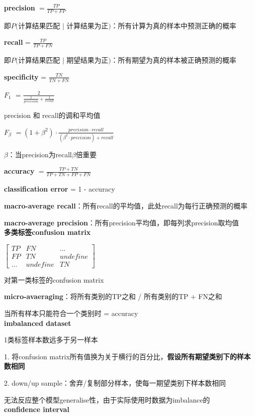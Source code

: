 \documentclass[UTF8]{ctexart}
\begin{document}
  \quad \textbf{precision} $= \frac{TP}{TP + FP}$

  \quad \quad 即$P($计算结果匹配 $|$ 计算结果为正$)$：所有计算为真的样本中预测正确的概率

  \quad \textbf{recall} = $\frac{TP}{TP + FN}$

  \quad \quad 即$P($计算结果匹配 $|$ 期望结果为正$)$：所有期望为真的样本被正确预测的概率

  \quad \textbf{specificity} = $\frac{TN}{TN + FN}$

  \quad \textbf{$F_1$} $= \frac{2}{\frac{1}{precision} + \frac{1}{recall}}$ 
  
  \quad \quad precision 和 recall的调和平均值

  \quad \textbf{$F_\beta$} $= (1 + \beta^2) \cdot \frac{precision \cdot recall}{(\beta^2 \cdot precision) + recall}$

  \quad \quad $\beta$：当precision为recall$\beta$倍重要

  \textbf{accuracy} $= \frac{TP + TN}{TP + TN + FP + FN}$

  \textbf{classification error} = 1 - accuracy
  
  \textbf{macro-average recall}：所有recall的平均值，此处recall为每行正确预测的概率

  \textbf{macro-average precision}：所有precision平均值，即每列求precision取均值\\
\textbf{多类标签confusion matrix}

  $\begin{bmatrix}
    TP & FN & ... \\
    FP & TN & undefine\\
    ... & undefine & TN
  \end{bmatrix}$
  
  对第一类标签的confusion matrix
  
  \textbf{micro-avaeraging}：将所有类别的TP之和 / 所有类别的TP + FN之和
  
  \quad 当所有样本只能符合一个类别时 = accuracy\\
\textbf{imbalanced dataset}

  1类标签样本数远多于另一样本
  
  1. 将confusion matrix所有值换为关于横行的百分比，\textbf{假设所有期望类别下的样本数相同}
  
  2. down/up sample：舍弃/复制部分样本，使每一期望类别下样本数相同
  
  \quad 无法反应整个模型generalise性，由于实际使用时数据为imbalance的\\
\textbf{confidence interval}
\end{document}
